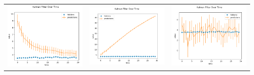 \documentclass[submit]{harvardml}
\begin{document}
\begin{enumerate}
\begin{center}
\begin{tabular}{ c c c }
 \includegraphics[scale=0.25]{a.png} & \includegraphics[scale=0.25]{b.png} & \includegraphics[scale=0.25]{c.png}  \\ 

\end{tabular}
\end{center}
\end{enumerate}
\end{document}
